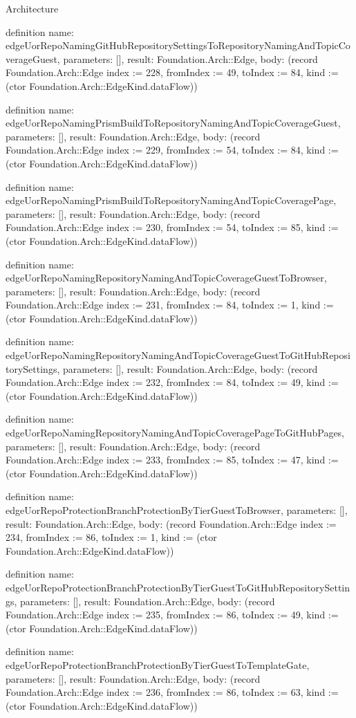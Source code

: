 \begin{lexlean}{Architecture}
\begin{semanticmodule}
definition{
  name: edgeUorRepoNamingGitHubRepositorySettingsToRepositoryNamingAndTopicCoverageGuest,
  parameters: [],
  result: Foundation.Arch::Edge,
  body: (record Foundation.Arch::Edge {index := 228, fromIndex := 49, toIndex := 84, kind := (ctor Foundation.Arch::EdgeKind.dataFlow)})
}

definition{
  name: edgeUorRepoNamingPrismBuildToRepositoryNamingAndTopicCoverageGuest,
  parameters: [],
  result: Foundation.Arch::Edge,
  body: (record Foundation.Arch::Edge {index := 229, fromIndex := 54, toIndex := 84, kind := (ctor Foundation.Arch::EdgeKind.dataFlow)})
}

definition{
  name: edgeUorRepoNamingPrismBuildToRepositoryNamingAndTopicCoveragePage,
  parameters: [],
  result: Foundation.Arch::Edge,
  body: (record Foundation.Arch::Edge {index := 230, fromIndex := 54, toIndex := 85, kind := (ctor Foundation.Arch::EdgeKind.dataFlow)})
}

definition{
  name: edgeUorRepoNamingRepositoryNamingAndTopicCoverageGuestToBrowser,
  parameters: [],
  result: Foundation.Arch::Edge,
  body: (record Foundation.Arch::Edge {index := 231, fromIndex := 84, toIndex := 1, kind := (ctor Foundation.Arch::EdgeKind.dataFlow)})
}

definition{
  name: edgeUorRepoNamingRepositoryNamingAndTopicCoverageGuestToGitHubRepositorySettings,
  parameters: [],
  result: Foundation.Arch::Edge,
  body: (record Foundation.Arch::Edge {index := 232, fromIndex := 84, toIndex := 49, kind := (ctor Foundation.Arch::EdgeKind.dataFlow)})
}

definition{
  name: edgeUorRepoNamingRepositoryNamingAndTopicCoveragePageToGitHubPages,
  parameters: [],
  result: Foundation.Arch::Edge,
  body: (record Foundation.Arch::Edge {index := 233, fromIndex := 85, toIndex := 47, kind := (ctor Foundation.Arch::EdgeKind.dataFlow)})
}

definition{
  name: edgeUorRepoProtectionBranchProtectionByTierGuestToBrowser,
  parameters: [],
  result: Foundation.Arch::Edge,
  body: (record Foundation.Arch::Edge {index := 234, fromIndex := 86, toIndex := 1, kind := (ctor Foundation.Arch::EdgeKind.dataFlow)})
}

definition{
  name: edgeUorRepoProtectionBranchProtectionByTierGuestToGitHubRepositorySettings,
  parameters: [],
  result: Foundation.Arch::Edge,
  body: (record Foundation.Arch::Edge {index := 235, fromIndex := 86, toIndex := 49, kind := (ctor Foundation.Arch::EdgeKind.dataFlow)})
}

definition{
  name: edgeUorRepoProtectionBranchProtectionByTierGuestToTemplateGate,
  parameters: [],
  result: Foundation.Arch::Edge,
  body: (record Foundation.Arch::Edge {index := 236, fromIndex := 86, toIndex := 63, kind := (ctor Foundation.Arch::EdgeKind.dataFlow)})
}


\end{semanticmodule}
\end{lexlean}
